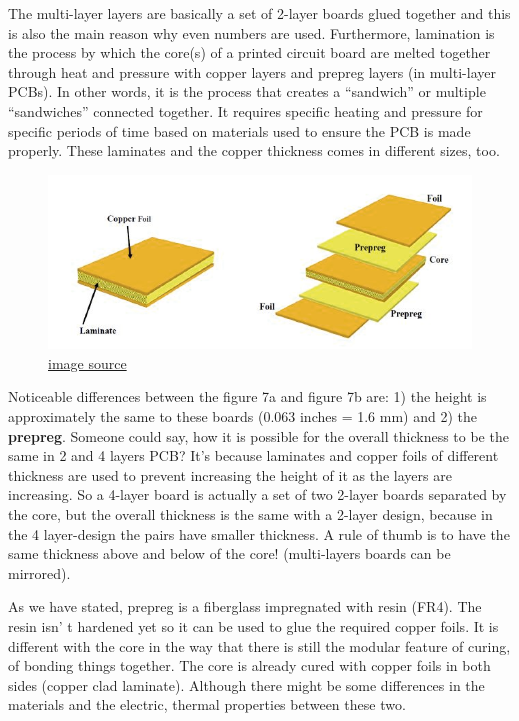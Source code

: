 \documentclass[final]{cubedoc}
\begin{document}
	The multi-layer layers are basically a set of 2-layer boards glued together and this is also the main reason why even numbers are used. Furthermore, lamination is the process by which the core(s) of a printed circuit board are melted together through heat and pressure with copper layers and prepreg layers (in multi-layer PCBs). In other words, it is the process that creates a “sandwich” or multiple “sandwiches” connected together. It requires specific heating and pressure for specific periods of time based on materials used to ensure the PCB is made properly.  These laminates and the copper thickness comes in different sizes, too.
	
	
	\begin{figure}[h!]
		\centering
		\includegraphics[keepaspectratio, height=.25\textheight, width=\textwidth]{assets/multi_layer_laminate_2.png}
		\caption{\href{https://web.archive.org/web/20200814083836/https://www.pcbcart.com/article/content/surface-finish-intro-and-comparision.html}{image source}}
	\end{figure}
	
	Noticeable differences between the figure 7a and figure 7b are: 1) the height is approximately the same to these boards (0.063 inches = 1.6 mm) and 2) the \textbf{prepreg}. Someone could say, how it is possible for the overall thickness to be the same in 2 and 4 layers PCB? It’s because laminates and copper foils of different thickness are used to prevent increasing the height of it as the layers are increasing. So a 4-layer board is actually a set of two 2-layer boards separated by  the core, but the overall thickness is the same with a 2-layer design, because in the 4 layer-design the pairs have smaller thickness. A rule of thumb is to have the same thickness above and below of the core! (multi-layers boards can be mirrored).
	
	As we have stated, prepreg is a fiberglass impregnated with resin (FR4). The resin isn'
	t hardened yet so it can be used to glue the required copper foils. It is different with the core in the way that there is still the modular feature of curing, of bonding things together. The core is already cured with copper foils in both sides (copper clad laminate). Although there might be some differences in the materials and the electric, thermal properties between these two.
	
\end{document}
